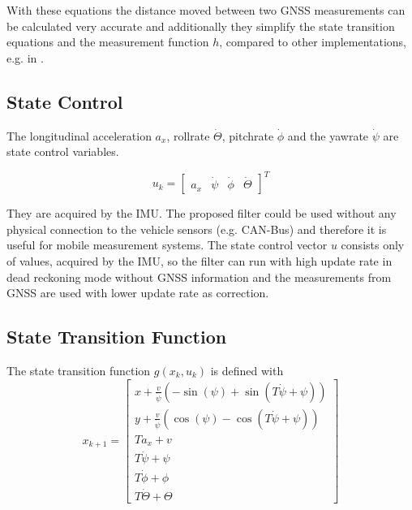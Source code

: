 \documentclass[a4paper,twoside]{article}
\begin{document}
With these equations the distance moved between two GNSS measurements can be calculated very accurate and additionally they simplify the state transition equations and the measurement function $h$, compared to other implementations, e.g. in \cite{Wender2008a}.

\subsection{State Control}

The longitudinal acceleration $a_x$, rollrate $\dot \Theta$, pitchrate $\dot \phi$ and the yawrate $\dot \psi$ are state control variables.

\begin{equation}\label{controlinput}u_k=\left[\begin{matrix}a_x & \dot\psi & \dot\phi & \dot\Theta \end{matrix}\right]^T\end{equation}

They are acquired by the IMU. The proposed filter could be used without any physical connection to the vehicle sensors (e.g. CAN-Bus) and therefore it is useful for mobile measurement systems. The state control vector $u$ consists only of values, acquired by the IMU, so the filter can run with high update rate in dead reckoning mode without GNSS information and the measurements from GNSS are used with lower update rate as correction.

\subsection{State Transition Function}

The state transition function $g(x_k, u_k)$ is defined with
\begin{equation}\label{statetransitionfunction}
x_{k+1}=\left[\begin{matrix}x + \frac{v}{\dot\psi} \left(- \sin{\left (\psi \right )} + \sin{\left (T \dot\psi + \psi \right )}\right)\\y + \frac{v}{\dot\psi} \left(\cos{\left (\psi \right )} - \cos{\left (T \dot\psi + \psi \right )}\right)\\T a_{x} + v\\T \dot\psi + \psi\\T \dot\phi + \phi\\T \dot\Theta + \Theta\end{matrix}\right]
\end{equation}
\end{document}
